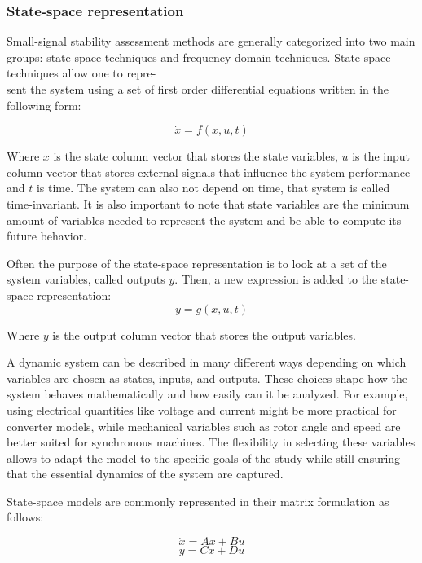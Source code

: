 \subsubsection{State-space representation}

Small-signal stability assessment methods are generally categorized into two main groups: state-space techniques
and frequency-domain techniques. State-space techniques allow one to repre-\\sent the system using a set of first order
differential equations written in the following form:

\begin{equation}
    \dot{x} = f(x,u,t)
\end{equation}

Where $x$ is the state column vector that stores the state variables, $u$ is the input column vector that stores external
signals that influence the system performance and $t$ is time. The system can also not depend on time, that system is called 
time-invariant. It is also important to note that state variables are the minimum amount of variables needed to represent the
system and be able to compute its future behavior.

Often the purpose of the state-space representation is to look at a set of the system variables, called outputs $y$. Then, a new 
expression is added to the state-space representation:
\begin{equation}
    y = g(x,u,t)
\end{equation}

Where $y$ is the output column vector that stores the output variables.

A dynamic system can be described in many different ways depending on which variables are chosen as states, inputs, 
and outputs. These choices shape how the system behaves mathematically and how easily can it be analyzed. For example, 
using electrical quantities like voltage and current might be more practical for converter models, while mechanical variables 
such as rotor angle and speed are better suited for synchronous machines. The flexibility in selecting these variables allows
to adapt the model to the specific goals of the study while still ensuring that the essential dynamics of the system are captured. 

State-space models are commonly represented in their matrix formulation as follows:

\begin{equation}
\dot{x} = Ax + Bu
\end{equation}
\begin{equation}
y = Cx + Du
\end{equation}


